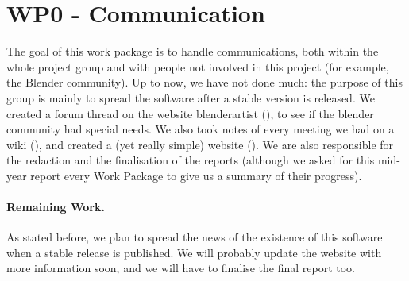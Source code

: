 \section{WP0 - Communication}

The goal of this work package is to handle communications, both within the whole project group and with people not involved in this project (for example, the Blender community). Up to now, we have not done much: the purpose of this group is mainly to spread the software after a stable version is released. We created a forum thread on the website blenderartist (\cite{blenderartist}), to see if the blender community had special needs. We also took notes of every meeting we had on a wiki (\cite{comptesrendus}), and created a (yet really simple) website (\cite{site}). We are also responsible for the redaction and the finalisation of the reports (although we asked for this mid-year report every Work Package to give us a summary of their progress).

\paragraph{Remaining Work.} As stated before, we plan to spread the news of the existence of this software when a stable release is published. We will probably update the website with more information soon, and we will have to finalise the final report too.
